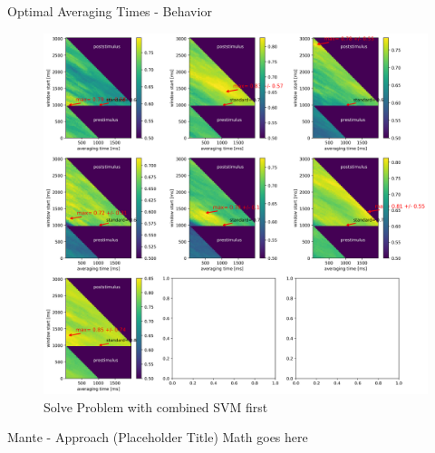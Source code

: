 \documentclass[10pt]{beamer}
\begin{document}
\begin{frame}[fragile]{Optimal Averaging Times - Behavior}
\begin{center}
	\begin{figure}
	\caption*{Solve Problem with combined SVM first}
      \includegraphics[width=1.0\textwidth]{placeholder_wind_hit.png}
	\end{figure}
	\end{center}
\end{frame}

\begin{frame}[fragile]{Mante - Approach (Placeholder Title)}
Math goes here
\end{frame}
\end{document}
